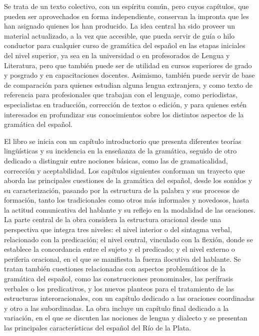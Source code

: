 Se trata de un texto colectivo, con un espíritu común, pero cuyos capítulos, que
pueden ser aprovechados en forma independiente, conservan la impronta que les
han asignado quienes los han producido. La idea central ha sido proveer un
material actualizado, a la vez que accesible, que pueda servir de guía o hilo
conductor para cualquier curso de gramática del español en las etapas iniciales
del nivel superior, ya sea en la universidad o en profesorados de Lengua y
Literatura, pero que también puede ser de utilidad en cursos superiores de grado
y posgrado y en capacitaciones docentes. Asimismo, también puede servir de base
de comparación para quienes estudian alguna lengua extranjera, y como texto de
referencia para profesionales que trabajan con el lenguaje, como periodistas,
especialistas en traducción, corrección de textos o edición, y para quienes estén
interesados en profundizar sus conocimientos sobre los distintos aspectos de la
gramática del español.

El libro se inicia con un capítulo introductorio que presenta diferentes teorías
lingüísticas y su incidencia en la enseñanza de la gramática, seguido de otro
dedicado a distinguir entre nociones básicas, como las de gramaticalidad,
corrección y aceptabilidad. Los capítulos siguientes conforman un trayecto que
aborda las principales cuestiones de la gramática del español, desde los sonidos
y su caracterización, pasando por la estructura de la palabra y sus procesos de
formación, tanto los tradicionales como otros más informales y novedosos, hasta
la actitud comunicativa del hablante y su reflejo en la modalidad de las
oraciones. La parte central de la obra considera la estructura oracional desde
una perspectiva que integra tres niveles: el nivel interior o del sintagma
verbal, relacionado con la predicación; el nivel central, vinculado con la
flexión, donde se establece la concordancia entre el sujeto y el predicado; y el
nivel externo o periferia oracional, en el que se manifiesta la fuerza ilocutiva
del hablante. Se tratan también cuestiones relacionadas con aspectos
problemáticos de la gramática del español, como las construcciones pronominales,
las perífrasis verbales o los predicativos, y los nuevos planteos para el
tratamiento de las estructuras interoracionales, con un capítulo dedicado a las
oraciones coordinadas y otro a las subordinadas. La obra incluye un capítulo
final dedicado a la variación, en el que se discuten las nociones de lengua y
dialecto y se presentan las principales características del español del Río de
la Plata.

